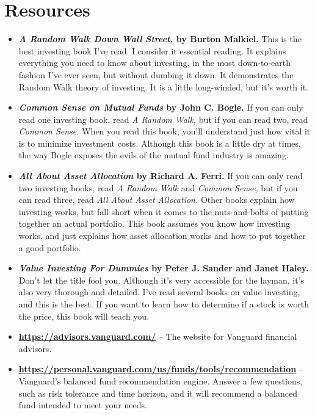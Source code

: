 \newpage
\section{Resources}
\begin{itemize}
\item \textbf{\emph{A Random Walk Down Wall Street,} by Burton Malkiel.} This is the best investing book I've read. I consider it essential reading. It explains everything you need to know about investing, in the most down-to-earth fashion I've ever seen, but without dumbing it down. It demonstrates the Random Walk theory of investing. It is a little long-winded, but it's worth it.

\item \textbf{\emph{Common Sense on Mutual Funds} by John C. Bogle.} If you can only read one investing book, read \emph{A Random Walk,} but if you can read two, read \emph{Common Sense.} When you read this book, you'll understand just how vital it is to minimize investment costs. Although this book is a little dry at times, the way Bogle exposes the evils of the mutual fund industry is amazing.

\item \textbf{\emph{All About Asset Allocation} by Richard A. Ferri.} If you can only read two investing books, read \emph{A Random Walk} and \emph{Common Sense,} but if you can read three, read \emph{All About Asset Allocation.} Other books explain how investing works, but fall short when it comes to the nuts-and-bolts of putting together an actual portfolio. This book assumes you know how investing works, and just explains how asset allocation works and how to put together a good portfolio.

\item \textbf{\emph{Value Investing For Dummies} by Peter J. Sander and Janet Haley.} Don't let the title fool you. Although it's very accessible for the layman, it's also very thorough and detailed. I've read several books on value investing, and this is the best. If you want to learn how to determine if a stock is worth the price, this book will teach you.

\item \textbf{\url{https://advisors.vanguard.com/}} -- The website for Vanguard financial advisors.

\item \textbf{\url{https://personal.vanguard.com/us/funds/tools/recommendation}} -- Vanguard's balanced fund recommendation engine. Answer a few questions, such as risk tolerance and time horizon, and it will recommend a balanced fund intended to meet your needs.
\end{itemize}

